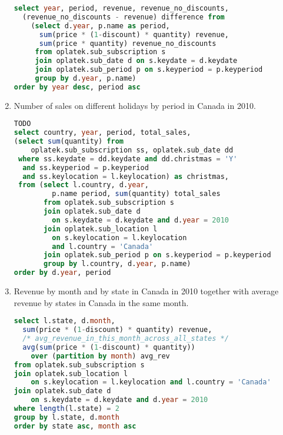 \begin{enumerate}
\begin{lstlisting}[language=sql]
select year, period, revenue, revenue_no_discounts, 
  (revenue_no_discounts - revenue) difference from 
    (select d.year, p.name as period, 
      sum(price * (1-discount) * quantity) revenue, 
      sum(price * quantity) revenue_no_discounts
     from oplatek.sub_subscription s 
     join oplatek.sub_date d on s.keydate = d.keydate
     join oplatek.sub_period p on s.keyperiod = p.keyperiod
     group by d.year, p.name)
order by year desc, period asc
\end{lstlisting}
  \item Number of sales on different holidays by period in Canada in 2010.
\begin{lstlisting}[language=sql] 
TODO
select country, year, period, total_sales, 
(select sum(quantity) from 
    oplatek.sub_subscription ss, oplatek.sub_date dd 
 where ss.keydate = dd.keydate and dd.christmas = 'Y' 
  and ss.keyperiod = p.keyperiod 
  and ss.keylocation = l.keylocation) as christmas,
 from (select l.country, d.year, 
         p.name period, sum(quantity) total_sales
       from oplatek.sub_subscription s 
       join oplatek.sub_date d 
         on s.keydate = d.keydate and d.year = 2010
       join oplatek.sub_location l 
         on s.keylocation = l.keylocation 
         and l.country = 'Canada'
       join oplatek.sub_period p on s.keyperiod = p.keyperiod 
       group by l.country, d.year, p.name)
order by d.year, period
\end{lstlisting}
  \item Revenue by month and by state in Canada in 2010 together with average revenue by states in Canada in the same month.
\begin{lstlisting}[language=sql] 
select l.state, d.month, 
  sum(price * (1-discount) * quantity) revenue,
  /* avg_revenue_in_this_month_across_all_states */
  avg(sum(price * (1-discount) * quantity)) 
    over (partition by month) avg_rev 
from oplatek.sub_subscription s 
join oplatek.sub_location l 
    on s.keylocation = l.keylocation and l.country = 'Canada' 
join oplatek.sub_date d 
    on s.keydate = d.keydate and d.year = 2010
where length(l.state) = 2
group by l.state, d.month
order by state asc, month asc
\end{lstlisting}
\end{enumerate}

